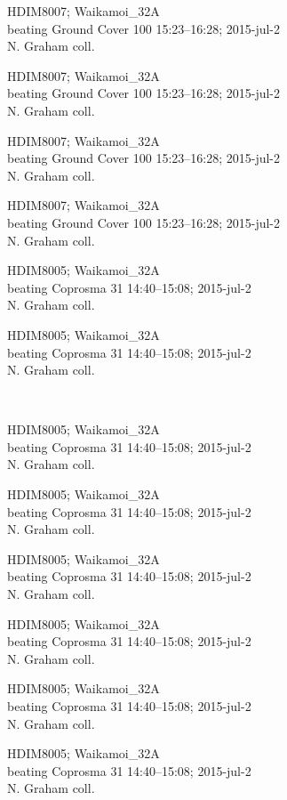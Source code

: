 \documentclass[2pt]{extarticle}
\begin{document}
\noindent
\parbox{0.16\textwidth}{\tiny \raggedright \rule[-0.3\baselineskip]{0pt}{10pt}HDIM8007; Waikamoi\_32A\\ beating Ground Cover 100 15:23--16:28; 2015-jul-2\\ N. Graham coll.}
\parbox{0.16\textwidth}{\tiny \raggedright \rule[-0.3\baselineskip]{0pt}{10pt}HDIM8007; Waikamoi\_32A\\ beating Ground Cover 100 15:23--16:28; 2015-jul-2\\ N. Graham coll.}
\parbox{0.16\textwidth}{\tiny \raggedright \rule[-0.3\baselineskip]{0pt}{10pt}HDIM8007; Waikamoi\_32A\\ beating Ground Cover 100 15:23--16:28; 2015-jul-2\\ N. Graham coll.}
\parbox{0.16\textwidth}{\tiny \raggedright \rule[-0.3\baselineskip]{0pt}{10pt}HDIM8007; Waikamoi\_32A\\ beating Ground Cover 100 15:23--16:28; 2015-jul-2\\ N. Graham coll.}
\parbox{0.16\textwidth}{\tiny \raggedright \rule[-0.3\baselineskip]{0pt}{10pt}HDIM8005; Waikamoi\_32A\\ beating Coprosma 31 14:40--15:08; 2015-jul-2\\ N. Graham coll.}
\parbox{0.16\textwidth}{\tiny \raggedright \rule[-0.3\baselineskip]{0pt}{10pt}HDIM8005; Waikamoi\_32A\\ beating Coprosma 31 14:40--15:08; 2015-jul-2\\ N. Graham coll.} \\ 
\vspace{0.001in} 

\noindent
\parbox{0.16\textwidth}{\tiny \raggedright \rule[-0.3\baselineskip]{0pt}{10pt}HDIM8005; Waikamoi\_32A\\ beating Coprosma 31 14:40--15:08; 2015-jul-2\\ N. Graham coll.}
\parbox{0.16\textwidth}{\tiny \raggedright \rule[-0.3\baselineskip]{0pt}{10pt}HDIM8005; Waikamoi\_32A\\ beating Coprosma 31 14:40--15:08; 2015-jul-2\\ N. Graham coll.}
\parbox{0.16\textwidth}{\tiny \raggedright \rule[-0.3\baselineskip]{0pt}{10pt}HDIM8005; Waikamoi\_32A\\ beating Coprosma 31 14:40--15:08; 2015-jul-2\\ N. Graham coll.}
\parbox{0.16\textwidth}{\tiny \raggedright \rule[-0.3\baselineskip]{0pt}{10pt}HDIM8005; Waikamoi\_32A\\ beating Coprosma 31 14:40--15:08; 2015-jul-2\\ N. Graham coll.}
\parbox{0.16\textwidth}{\tiny \raggedright \rule[-0.3\baselineskip]{0pt}{10pt}HDIM8005; Waikamoi\_32A\\ beating Coprosma 31 14:40--15:08; 2015-jul-2\\ N. Graham coll.}
\parbox{0.16\textwidth}{\tiny \raggedright \rule[-0.3\baselineskip]{0pt}{10pt}HDIM8005; Waikamoi\_32A\\ beating Coprosma 31 14:40--15:08; 2015-jul-2\\ N. Graham coll.} \\ 
\vspace{0.001in} 
\end{document}
